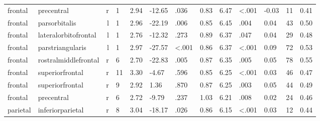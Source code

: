 \documentclass{article}
\begin{document}
\begin{longtable}{llrR{1.3cm}R{1cm}R{1.3cm}R{1cm}R{1cm}R{1.3cm}R{1cm}R{1.8cm}R{1.3cm}R{1.8cm}}
   frontal &                precentral &    r &         1 &                  2.94 &           -12.65 &               .036 &                               0.83 &                          6.47 &                   \textless.001 &  -0.03 &     11 &      0.41 \\
   frontal &             parsorbitalis &    l &         1 &                  2.96 &           -22.19 &               .006 &                               0.85 &                          6.45 &                            .004 &   0.04 &     43 &      0.50 \\
   frontal &      lateralorbitofrontal &    l &         1 &                  2.76 &           -12.32 &               .273 &                               0.89 &                          6.37 &                            .047 &   0.04 &     29 &      0.48 \\
   frontal &          parstriangularis &    l &         1 &                  2.97 &           -27.57 &      \textless.001 &                               0.86 &                          6.37 &                   \textless.001 &   0.09 &     72 &      0.53 \\
   frontal &      rostralmiddlefrontal &    r &         6 &                  2.70 &           -22.83 &               .005 &                               0.87 &                          6.35 &                            .005 &   0.05 &     78 &      0.55 \\
   frontal &           superiorfrontal &    r &        11 &                  3.30 &            -4.67 &               .596 &                               0.85 &                          6.25 &                   \textless.001 &   0.03 &     46 &      0.47 \\
   frontal &           superiorfrontal &    r &         9 &                  2.92 &             1.36 &               .870 &                               0.87 &                          6.25 &                            .003 &   0.05 &     44 &      0.49 \\
   frontal &                precentral &    r &         6 &                  2.72 &            -9.79 &               .237 &                               1.03 &                          6.21 &                            .008 &   0.02 &     24 &      0.46 \\
  parietal &          inferiorparietal &    r &         8 &                  3.04 &           -18.17 &               .026 &                               0.86 &                          6.15 &                   \textless.001 &   0.03 &     12 &      0.44 \\

\end{longtable}
\end{document}
